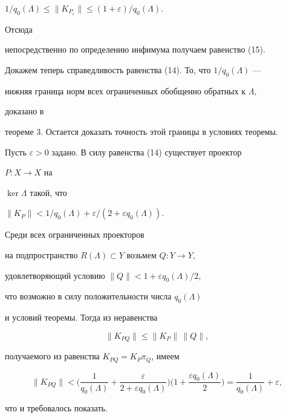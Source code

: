 \begin{pf}
$1/q_0(\Lambda)\le\|K_{P_\varepsilon}\|\le(1+\varepsilon)/q_0(\Lambda)$. 


Отсюда 


непосредственно по определению инфимума получаем равенство (15).  


 


Докажем теперь справедливость равенства (14). То, что $1/q_0(\Lambda)$ --- 


нижняя граница норм всех ограниченных обобщенно обратных к $\Lambda$, 


доказано в  


теореме 3. Остается доказать точность этой границы в условиях теоремы.  


Пусть $\varepsilon>0$ задано. В силу равенства (14) существует проектор 


$P:X\to X$ на 


$\ker\Lambda$ такой, что 


$\|K_P\|<1/q_0(\Lambda)+\varepsilon/(2+\varepsilon q_0(\Lambda))$. 


Среди всех ограниченных проекторов 


на подпространство $R(\Lambda)\subset Y$ возьмем $Q:Y\to Y$, 


удовлетворяющий условию $\|Q\|<1+\varepsilon q_0(\Lambda)/2$, 


что возможно в силу положительности числа $q_0(\Lambda)$ 


и условий теоремы. Тогда из неравенства 


\begin{equation} 


\|K_{PQ}\|\le\|K_P\|\,\|Q\|, 


\end{equation} 


получаемого из равенства $K_{PQ}=K_P\pi_Q$, имеем 


$$ 


\|K_{PQ}\|<\bigg(\frac{1}{q_0(\Lambda)}+ 


\frac{\varepsilon}{2+\varepsilon q_0(\Lambda)}\bigg) 


\bigg(1+\frac{\varepsilon q_0(\Lambda)}{2}\bigg)= 


\frac{1}{q_0(\Lambda)}+\varepsilon, 


$$ 


что и требовалось показать. 


\end{pf} 


 


